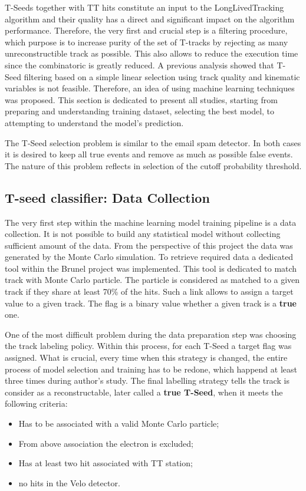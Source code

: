 T-Seeds together with TT hits constitute an input to the LongLivedTracking algorithm and their quality has a direct and significant impact on the algorithm performance. Therefore, the very first and crucial step is a filtering procedure, which purpose is to increase purity of the set of T-tracks by rejecting as many unreconstructible track as possible. This also allows to reduce the execution time since the combinatoric is greatly reduced. A previous analysis showed that T-Seed filtering based on a simple linear selection using track quality and kinematic variables is not feasible. Therefore, an idea of using machine learning techniques was proposed. This section is dedicated to present all studies, starting from preparing and understanding training dataset, selecting the best model, to attempting to understand the model's prediction. 

The T-Seed selection problem is similar to the email spam detector. In both cases it is desired to keep all true events and remove as much as possible false events. The nature of this problem reflects in selection of the cutoff probability threshold.   

\subsection{T-seed classifier: Data Collection} 

The very first step within the machine learning model training pipeline is a data collection. It is not possible to build any statistical model without collecting sufficient amount of the data. From the perspective of this project the data was generated by the Monte Carlo simulation. To retrieve required data a dedicated tool within the Brunel project was implemented. This tool is dedicated to match track with Monte Carlo particle. The particle is considered as matched to a given track if they share at least 70\% of the hits. Such a link allows to assign a target value to a given track. The flag is a binary value whether a given track is a \textbf{true} one.    

One of the most difficult problem during the data preparation step was choosing the track labeling policy. Within this process, for each T-Seed a target flag was assigned. What is crucial, every time when this strategy is changed, the entire process of model selection and training has to be redone, which happend at least three times during author's study. The final labelling strategy tells the track is consider as a reconstructable, later called a \textbf{true T-Seed}, when it meets the following criteria:
\begin{itemize}
    \item Has to be associated with a valid Monte Carlo particle;
    \item From above association the electron is excluded; 
    \item Has at least two hit associated with TT station;
    \item no hits in the Velo detector. 
\end{itemize}

